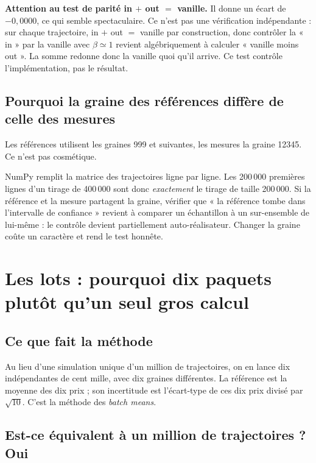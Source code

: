 \documentclass[11pt,a4paper]{article}
\begin{document}
\begin{encadre}
\textbf{Attention au test de parité in $+$ out $=$ vanille.} Il donne un écart
de $-0{,}0000$, ce qui semble spectaculaire. Ce n'est pas une vérification
indépendante : sur chaque trajectoire, in $+$ out $=$ vanille par
construction, donc contrôler la « in » par la vanille avec $\beta \simeq 1$
revient algébriquement à calculer « vanille moins out ». La somme redonne donc
la vanille quoi qu'il arrive. Ce test contrôle l'implémentation, pas le
résultat.
\end{encadre}

\subsection{Pourquoi la graine des références diffère de celle des mesures}

Les références utilisent les graines 999 et suivantes, les mesures la graine
12345. Ce n'est pas cosmétique.

NumPy remplit la matrice des trajectoires ligne par ligne. Les 200\,000
premières lignes d'un tirage de 400\,000 sont donc \emph{exactement} le tirage
de taille 200\,000. Si la référence et la mesure partagent la graine, vérifier
que « la référence tombe dans l'intervalle de confiance » revient à comparer un
échantillon à un sur-ensemble de lui-même : le contrôle devient partiellement
auto-réalisateur. Changer la graine coûte un caractère et rend le test honnête.

\section{Les lots : pourquoi dix paquets plutôt qu'un seul gros calcul}

\subsection{Ce que fait la méthode}

Au lieu d'une simulation unique d'un million de trajectoires, on en lance dix
indépendantes de cent mille, avec dix graines différentes. La référence est la
moyenne des dix prix ; son incertitude est l'écart-type de ces dix prix divisé
par $\sqrt{10}$. C'est la méthode des \emph{batch means}.

\subsection{Est-ce équivalent à un million de trajectoires ? Oui}
\end{document}
